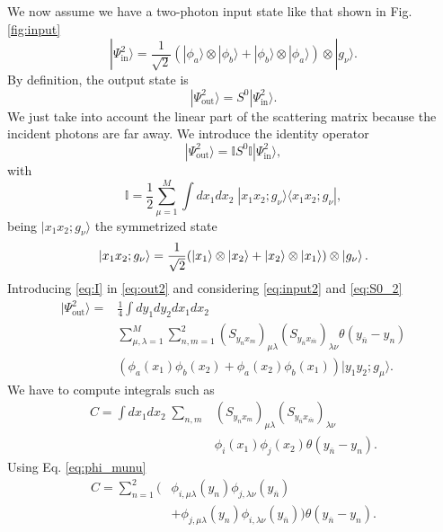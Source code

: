 \documentclass[aps,pra,reprint,amsmath,amssymb]{revtex4-1}
\begin{document}
We now assume we have a two-photon input state like that shown in Fig. \ref{fig:input}
\begin{equation}\label{eq:input2}
|\Psi_\text{in}^2\rangle = \frac{1}{\sqrt{2}}(|\phi_a\rangle\otimes|\phi_b\rangle+|\phi_b\rangle\otimes|\phi_a\rangle)\otimes|g_\nu\rangle.
\end{equation}
By definition, the output state is
\begin{equation}
|\Psi_\text{out}^2\rangle = S^0|\Psi_\text{in}^2\rangle.
\end{equation}
We just take into account the linear part of the scattering matrix because the incident photons are far away. We introduce the identity operator
\begin{equation}\label{eq:out2}
|\Psi_\text{out}^2\rangle = \mathbb{I}S^0\mathbb{I}|\Psi_\text{in}^2\rangle,
\end{equation}
with
\begin{equation}\label{eq:I}
\mathbb{I}=\frac{1}{2}\sum_{\mu=1}^M \int dx_1dx_2\;|x_1x_2;g_\nu\rangle \langle x_1x_2;g_\nu|,
\end{equation}
being $|x_1x_2;g_\nu\rangle$ the symmetrized state
\begin{equation}
|x_1x_2;g_\nu\rangle=\frac{1}{\sqrt{2}}(|x_1\rangle\otimes|x_2\rangle + |x_2\rangle\otimes|x_1\rangle)\otimes \ket{g_\nu}.
\end{equation}
Introducing \eqref{eq:I} in \eqref{eq:out2} and considering \eqref{eq:input2} and \eqref{eq:S0_2}
\begin{align}\label{eq:out2_2}
|\Psi_\text{out}^2\rangle = &\frac{1}{4}\int dy_1dy_2dx_1dx_2\nonumber\\
&\sum_{\mu,\lambda=1}^M\sum_{n,m=1}^2(S_{y_nx_m})_{\mu\lambda} (S_{y_{\overline{n}}x_{\overline{m}}})_{\lambda\nu}\theta(y_{\overline{n}}-y_n)\nonumber\\
&(\phi_a(x_1)\phi_b(x_2)+\phi_a(x_2)\phi_b(x_1))|y_1y_2;g_\mu\rangle.
\end{align}
We have to compute integrals such as
\begin{align}
C=\int dx_1dx_2\;\sum_{n,m}&(S_{y_nx_m})_{\mu\lambda} (S_{y_{\overline{n}}x_{\overline{m}}})_{\lambda\nu}\nonumber\\
&\phi_i(x_1)\phi_j(x_2)\theta(y_{\overline{n}}-y_n).
\end{align}
Using Eq. \eqref{eq:phi_munu}
\begin{align}\label{eq:C1}
C=\sum_{n=1}^2(&\phi_{i,\mu\lambda}(y_n)\phi_{j,\lambda\nu}(y_{\overline{n}}) \nonumber\\
& + \phi_{j,\mu\lambda}(y_n)\phi_{i,\lambda\nu}(y_{\overline{n}}))\theta(y_{\overline{n}}-y_n).
\end{align}
\end{document}
